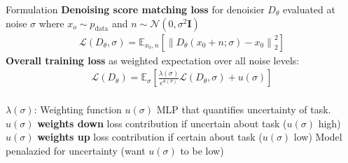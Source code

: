 \documentclass{beamer}
\begin{document}
\begin{frame}[t]{Formulation}
    \textbf{Denoising score matching loss} for denoisier $D_\theta$ evaluated at noise $\sigma$ where $x_o \sim p_\text{data}$
    and $n \sim \mathcal{N}(0, \sigma^2 \mathbf{I})$ 
    \begin{gather}\label{eq:2}
        \mathcal{L}(D_\theta, \sigma) = \mathbb{E}_{x_0, n} \left[ \left\| D_\theta(x_0 + n; \sigma) - x_0 \right\|_2^2 \right]
    \end{gather}
    \textbf{Overall training loss} as weighted expectation over all noise levels:
    \begin{gather}\label{eq:3}
        \mathcal{L}(D_\theta) = \mathbb{E}_\sigma \left[ \frac{\lambda(\sigma)}{e^{u(\sigma)}} \mathcal{L}(D_\theta, \sigma)+ u(\sigma) \right] \\
    \end{gather}

    $\lambda(\sigma)$: Weighting function \newline 
    $u(\sigma)$ MLP that quantifies uncertainty of task.\newline
    $u(\sigma)$ \textbf{weights down} loss contribution if uncertain about task ($u(\sigma)$ high)
    $u(\sigma)$ \textbf{weights up} loss contribution if certain about task ($u(\sigma)$ low)
    \newline
    Model penalazied for uncertainty (want $u(\sigma)$ to be low)
\end{frame}
\end{document}
